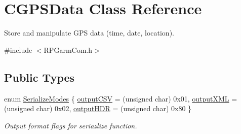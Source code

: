 \hypertarget{classCGPSData}{
\section{CGPSData Class Reference}
\label{classCGPSData}
}


Store and manipulate GPS data (time, date, location).  




{\ttfamily \#include $<$RPGarmCom.h$>$}

\subsection*{Public Types}
\begin{DoxyCompactItemize}
\item 
enum \hyperlink{classCGPSData_a3ed27f817d8b14809afa88f75761c8f5}{SerializeModes} \{ \hyperlink{classCGPSData_a3ed27f817d8b14809afa88f75761c8f5adffe984c3311ab5327b5dbf8cceb2944}{outputCSV} =  (unsigned char) 0x01, 
\hyperlink{classCGPSData_a3ed27f817d8b14809afa88f75761c8f5a5d9fcdcdbf6756012ff5c553e693b718}{outputXML} =  (unsigned char) 0x02, 
\hyperlink{classCGPSData_a3ed27f817d8b14809afa88f75761c8f5aaebaf5d98136feb3281b6cc80c2ccdbe}{outputHDR} =  (unsigned char) 0x80
 \}
\begin{DoxyCompactList}\small\item\em Output format flags for seriazlize function. \item\end{DoxyCompactList}\end{DoxyCompactItemize}
